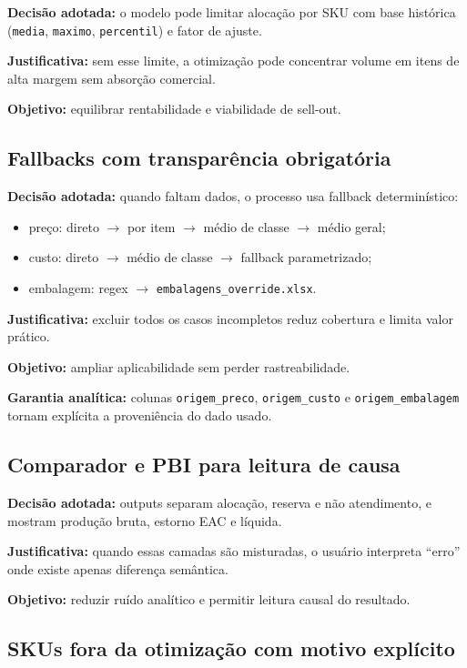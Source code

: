 \documentclass[11pt,a4paper]{article}
\begin{document}
\textbf{Decisão adotada:} o modelo pode limitar alocação por SKU com base
histórica (\texttt{media}, \texttt{maximo}, \texttt{percentil}) e fator de
ajuste.

\textbf{Justificativa:} sem esse limite, a otimização pode concentrar volume em
itens de alta margem sem absorção comercial.

\textbf{Objetivo:} equilibrar rentabilidade e viabilidade de sell-out.

\subsection{Fallbacks com transparência obrigatória}

\textbf{Decisão adotada:} quando faltam dados, o processo usa fallback
determinístico:
\begin{itemize}[leftmargin=1.2cm]
    \item preço: direto \(\rightarrow\) por item \(\rightarrow\) médio de classe \(\rightarrow\) médio geral;
    \item custo: direto \(\rightarrow\) médio de classe \(\rightarrow\) fallback parametrizado;
    \item embalagem: regex \(\rightarrow\) \texttt{embalagens\_override.xlsx}.
\end{itemize}

\textbf{Justificativa:} excluir todos os casos incompletos reduz cobertura e
limita valor prático.

\textbf{Objetivo:} ampliar aplicabilidade sem perder rastreabilidade.

\textbf{Garantia analítica:} colunas \texttt{origem\_preco},
\texttt{origem\_custo} e \texttt{origem\_embalagem} tornam explícita a
proveniência do dado usado.

\subsection{Comparador e PBI para leitura de causa}

\textbf{Decisão adotada:} outputs separam alocação, reserva e não atendimento, e
mostram produção bruta, estorno EAC e líquida.

\textbf{Justificativa:} quando essas camadas são misturadas, o usuário interpreta
``erro'' onde existe apenas diferença semântica.

\textbf{Objetivo:} reduzir ruído analítico e permitir leitura causal do resultado.

\subsection{SKUs fora da otimização com motivo explícito}
\end{document}
